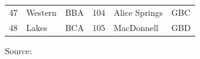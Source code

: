 \documentclass[a4paper,11pt]{article}
\theoremstyle{definition}
\begin{document}
\begin{table}[H]
\begin{tabular}{r l l|r l l}
		47                                   & Western                 & BBA            & 104                                             & Alice Springs                   & GBC            \\
		48                                   & Lakes                   & BCA            & 105                                             & MacDonnell                      & GBD            \\
		\bottomrule
	\end{tabular}
	\begin{flushleft}
		\begin{footnotesize}
			Source: \cite{wickramasuriya2019, difonzo2022a}
		\end{footnotesize}
	\end{flushleft}
\end{table}
\end{document}
